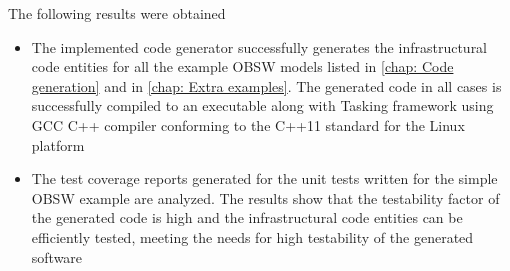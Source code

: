 The following results were obtained 
\begin{itemize}
\item  The implemented code generator successfully generates the infrastructural code entities for all the example OBSW models listed in \cref{chap: Code generation} and in \cref{chap: Extra examples}. The generated code in all cases is successfully compiled to an executable along with Tasking framework using GCC C++ compiler conforming to the C++11 standard for the Linux platform
\item The test coverage reports generated for the unit tests written for the simple OBSW example are analyzed. The results show that the testability factor of the generated code is high and the infrastructural code entities can be efficiently tested, meeting the needs for high testability of the generated software      
\end{itemize}

